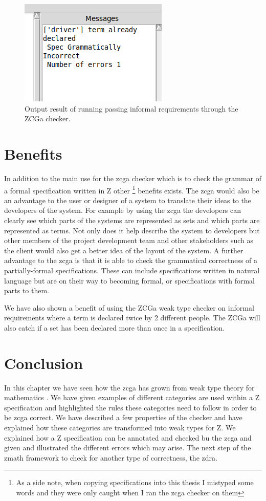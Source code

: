  \begin{figure}[H]
    \centering
    \includegraphics[scale=0.5]{Figures/zcga/driverdeclared.png}
    \caption{Output result of running passing informal requirements
         through the ZCGa checker. \label{fig:zcgaautopilotresult}}
    \end{figure}

\section{Benefits}

In addition to the main use for the \gls{zcga} checker which is to check the
grammar of a formal specification written in Z other \footnote{As a side note,
when copying specifications into this thesis I mistyped some words and they were
only caught when I ran the \gls{zcga} checker on them} benefits exists. The
\gls{zcga} would also be an advantage to the user or designer of a system to
translate their ideas to the developers of the system. For example by using the
\gls{zcga} the developers can clearly see which parts of the systems are
represented as sets and which parts are represented as terms. Not only does it
help describe the system to developers but other members of the project
development team and other stakeholders such as the client would also get a
better idea of the layout of the system. A further advantage to the \gls{zcga}
is that it is able to check the grammatical correctness of a partially-formal
specifications. These can include specifications written in natural
language but are on their way to becoming formal, or specifications with formal
parts to them.

We have also shown a benefit of using the ZCGa weak type checker on informal
requirements where a term is declared twice by 2 different people. The ZCGa will
also catch if a set has been declared more than once in a specification.

\section{Conclusion}
In this chapter we have seen how the \gls{zcga} has grown from weak type theory
for mathematics \cite{wtt}. We have given examples of different categories are
used within a Z specification and highlighted the rules these categories need to
follow in order to be \gls{zcga} correct. We have described a few properties of
the checker and have explained how these categories are transformed into weak
types for Z. We explained how a Z specification can be annotated and checked bu
the \gls{zcga} and given and illustrated the different errors which may arise.
The next step of the \gls{zmath} framework to check for another type of
correctness, the \gls{zdra}.
